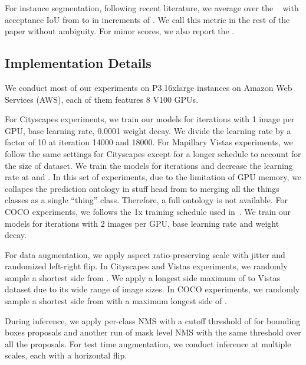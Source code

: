 \documentclass[10pt,twocolumn]{article}
\begin{document}
    For instance segmentation, following recent literature, we average over the ~\cite{hariharan2014simultaneous} with acceptance \ac{IoU} from  to  in increments of . We call this metric  in the rest of the paper without ambiguity. For minor scores, we also report the .






\subsection{Implementation Details}
We conduct most of our experiments on P3.16xlarge instances on Amazon Web Services (AWS), each of them features 8 V100 GPUs. 


For Cityscapes experiments, we train our models for  iterations with 1 image per GPU,  base learning rate, 0.0001 weight decay. We divide the learning rate by a factor of 10 at iteration 14000 and 18000.
For Mapillary Vistas experiments, we follow the same settings for Cityscapes except for a longer schedule to account for the size of dataset. We train the models for  iterations and decrease the learning rate at  and . In this set of experiments, due to the limitation of GPU memory, we collapes the prediction ontology in stuff head from  to  merging all the  things classes as a single ``thing'' class. Therefore, a full ontology  is not available.
For COCO experiments, we follows the 1x training schedule used in~\cite{he2017mask}. We train our models for  iterations with 2 images per GPU,  base learning rate and  weight decay.


For data augmentation, we apply aspect ratio-preserving scale with jitter and randomized left-right flip. In Cityscapes and Vistas experiments, we randomly sample a shortest side from . We apply a longest side maximum of  to Vistas dataset due to its wide range of image sizes. In COCO experiments, we randomly sample a shortest side from  with a maximum longest side of .

During inference, we apply per-class NMS with a cutoff threshold of  for bounding boxes proposals and another run of mask level NMS with the same threshold over all the proposals. For test time augmentation, we conduct inference at multiple scales, each with a horizontal flip. 
\end{document}
